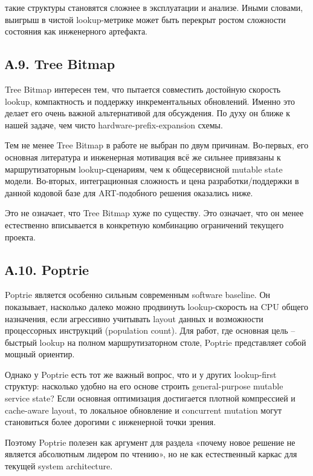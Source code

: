 такие структуры становятся сложнее в эксплуатации и анализе. Иными
словами, выигрыш в чистой lookup-метрике может быть перекрыт ростом
сложности состояния как инженерного артефакта.

\subsection*{А.9. Tree Bitmap}

Tree Bitmap \cite{eatherton2004treebitmap} интересен тем, что
пытается совместить достойную скорость lookup, компактность и
поддержку инкрементальных обновлений. Именно это делает его очень
важной альтернативой для обсуждения. По духу он ближе к нашей задаче,
чем чисто hardware-prefix-expansion схемы.

Тем не менее Tree Bitmap в работе не выбран по двум причинам.
Во-первых, его основная литература и инженерная мотивация всё же
сильнее привязаны к маршрутизаторным lookup-сценариям, чем к
общесервисной mutable state модели. Во-вторых, интеграционная
сложность и цена разработки/поддержки в данной кодовой базе для
ART-подобного решения оказались ниже.

Это не означает, что Tree Bitmap хуже по существу. Это означает, что
он менее естественно вписывается в конкретную комбинацию ограничений
текущего проекта.

\subsection*{А.10. Poptrie}

Poptrie \cite{asai2015poptrie} является особенно сильным современным
software baseline. Он показывает, насколько далеко можно продвинуть
lookup-скорость на CPU общего назначения, если агрессивно учитывать
layout данных и возможности процессорных инструкций (population
count). Для работ, где основная цель -- быстрый lookup на полном
маршрутизаторном столе, Poptrie представляет собой мощный ориентир.

Однако у Poptrie есть тот же важный вопрос, что и у других
lookup-first структур: насколько удобно на его основе строить
general-purpose mutable service state? Если основная оптимизация
достигается плотной компрессией и cache-aware layout, то локальное
обновление и concurrent mutation могут становиться более дорогими с
инженерной точки зрения.

Поэтому Poptrie полезен как аргумент для раздела «почему новое
решение не является абсолютным лидером по чтению», но не как
естественный каркас для текущей system architecture.

